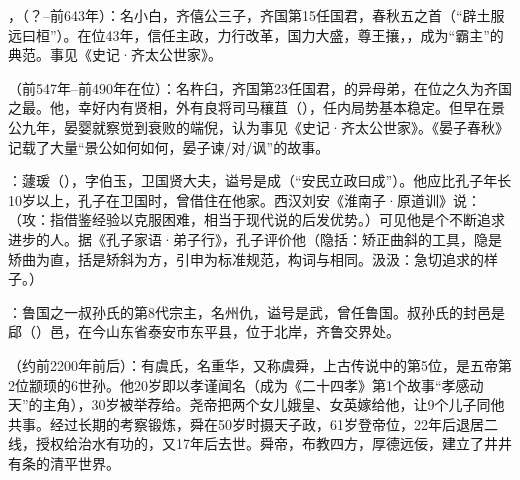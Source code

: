 ，（？--前643年）：名小白，齐僖公三子，齐国第15任国君，春秋五之首（“辟土服远曰桓”）。在位43年，信任主政，力行改革，国力大盛，尊王攘，，成为“霸主”的典范。事见《史记·齐太公世家》。

（前547年--前490年在位）：名杵臼，齐国第23任国君，的异母弟，在位之久为齐国之最。他，幸好内有贤相，外有良将司马穰苴（），任内局势基本稳定。但早在景公九年，晏婴就察觉到衰败的端倪，认为事见《史记·齐太公世家》。《晏子春秋》记载了大量“景公如何如何，晏子谏/对/讽”的故事。

：蘧瑗（），字伯玉，卫国贤大夫，谥号是成（“安民立政曰成”）。他应比孔子年长10岁以上，孔子在卫国时，曾借住在他家。西汉刘安《淮南子·原道训》说：（攻：指借鉴经验以克服困难，相当于现代说的后发优势。）可见他是个不断追求进步的人。据《孔子家语·弟子行》，孔子评价他（隐括：矫正曲斜的工具，隐是矫曲为直，括是矫斜为方，引申为标准规范，构词与相同。汲汲：急切追求的样子。）

：鲁国之一叔孙氏的第8代宗主，名州仇，谥号是武，曾任鲁国。叔孙氏的封邑是郈（）邑，在今山东省泰安市东平县，位于北岸，齐鲁交界处。


（约前2200年前后）：有虞氏，名重华，又称虞舜，上古传说中的第5位，是五帝第2位颛顼的6世孙。他20岁即以孝谨闻名（成为《二十四孝》第1个故事“孝感动天”的主角），30岁被举荐给。尧帝把两个女儿娥皇、女英嫁给他，让9个儿子同他共事。经过长期的考察锻炼，舜在50岁时摄天子政，61岁登帝位，22年后退居二线，授权给治水有功的，又17年后去世。舜帝，布教四方，厚德远佞，建立了井井有条的清平世界。

